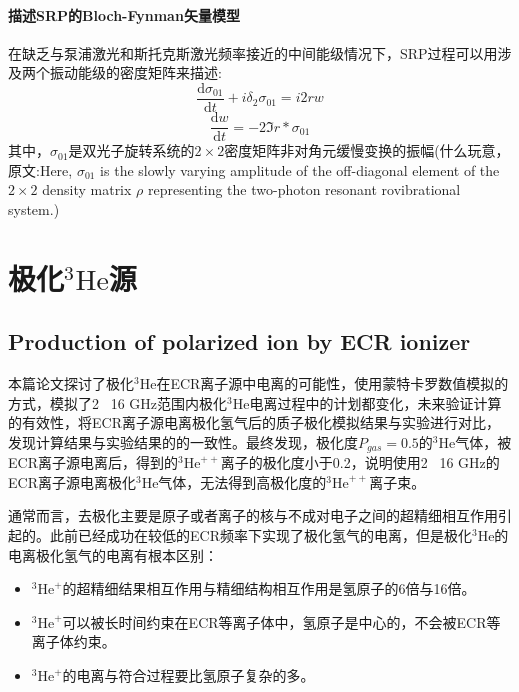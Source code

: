 \documentclass{article}
\numberwithin{equation}{subsection} %
\numberwithin{figure}{subsection} %
\numberwithin{table}{subsection} %
\begin{document}
\paragraph{描述SRP的Bloch-Fynman矢量模型} 
在缺乏与泵浦激光和斯托克斯激光频率接近的中间能级情况下，SRP过程可以用涉及两个振动能级的密度矩阵来描述:
\begin{equation}
    \frac{\mathrm{d} \sigma_{01}}{\mathrm{d} t}  + i\delta_2 \sigma_{01}  = i2rw
    \label{eq:bloch_fynman_vector_model_for_SRP}
\end{equation}
\begin{equation}
    \frac{\mathrm{d} w}{\mathrm{d} t}   = -2 \Im{r*\sigma_{01}}
    \label{eq:bloch_fynman_vector_model_for_SRP}
\end{equation}
其中，$\sigma_{01}$是双光子旋转系统的$2 \times 2$密度矩阵非对角元缓慢变换的振幅(什么玩意，原文:Here, $\sigma_{01}$ is the slowly varying amplitude of the off-diagonal element of the $2 \times 2$ density matrix $\rho$ representing the two-photon resonant rovibrational system.)









\newpage
\section{极化$^{3}\text{He}$源}
\subsection{Production of polarized ion by ECR ionizer\cite{tanaka_production_2004}}
本篇论文探讨了极化$^{3}\mathrm{He}$在ECR离子源中电离的可能性，使用蒙特卡罗数值模拟的方式，模拟了2~ 16 GHz范围内极化$^{3}\mathrm{He}$电离过程中的计划都变化，未来验证计算的有效性，将ECR离子源电离极化氢气后的质子极化模拟结果与实验进行对比，发现计算结果与实验结果的的一致性。最终发现，极化度$P_{gas} = 0.5$的$^{3}\mathrm{He}$气体，被ECR离子源电离后，得到的$^{3}\mathrm{He}^{++}$离子的极化度小于0.2，说明使用2~ 16 GHz的ECR离子源电离极化$^{3}\mathrm{He}$气体，无法得到高极化度的$^{3}\mathrm{He}^{++}$离子束。

通常而言，去极化主要是原子或者离子的核与不成对电子之间的超精细相互作用引起的。此前已经成功在较低的ECR频率下实现了极化氢气的电离，但是极化$^{3}\mathrm{He}$的电离极化氢气的电离有根本区别：
\begin{itemize}
    \item $^{3}\mathrm{He}^+$的超精细结果相互作用与精细结构相互作用是氢原子的6倍与16倍。
    \item $^{3}\mathrm{He}^+$可以被长时间约束在ECR等离子体中，氢原子是中心的，不会被ECR等离子体约束。
    \item $^{3}\mathrm{He}^+$的电离与符合过程要比氢原子复杂的多。
\end{itemize}
\end{document}

